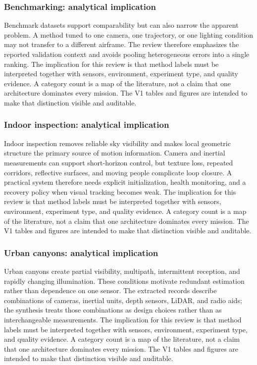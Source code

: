\documentclass[
  journal,
  10pt]{IEEEtran}
\begin{document}
\subsubsection{Benchmarking: analytical
implication}\label{benchmarking-analytical-implication-1}

Benchmark datasets support comparability but can also narrow the
apparent problem. A method tuned to one camera, one trajectory, or one
lighting condition may not transfer to a different airframe. The review
therefore emphasizes the reported validation context and avoids pooling
heterogeneous errors into a single ranking. The implication for this
review is that method labels must be interpreted together with sensors,
environment, experiment type, and quality evidence. A category count is
a map of the literature, not a claim that one architecture dominates
every mission. The V1 tables and figures are intended to make that
distinction visible and auditable.

\subsubsection{Indoor inspection: analytical
implication}\label{indoor-inspection-analytical-implication-2}

Indoor inspection removes reliable sky visibility and makes local
geometric structure the primary source of motion information. Camera and
inertial measurements can support short-horizon control, but texture
loss, repeated corridors, reflective surfaces, and moving people
complicate loop closure. A practical system therefore needs explicit
initialization, health monitoring, and a recovery policy when visual
tracking becomes weak. The implication for this review is that method
labels must be interpreted together with sensors, environment,
experiment type, and quality evidence. A category count is a map of the
literature, not a claim that one architecture dominates every mission.
The V1 tables and figures are intended to make that distinction visible
and auditable.

\subsubsection{Urban canyons: analytical
implication}\label{urban-canyons-analytical-implication-2}

Urban canyons create partial visibility, multipath, intermittent
reception, and rapidly changing illumination. These conditions motivate
redundant estimation rather than dependence on one sensor. The extracted
records describe combinations of cameras, inertial units, depth sensors,
LiDAR, and radio aids; the synthesis treats those combinations as design
choices rather than as interchangeable measurements. The implication for
this review is that method labels must be interpreted together with
sensors, environment, experiment type, and quality evidence. A category
count is a map of the literature, not a claim that one architecture
dominates every mission. The V1 tables and figures are intended to make
that distinction visible and auditable.
\end{document}
